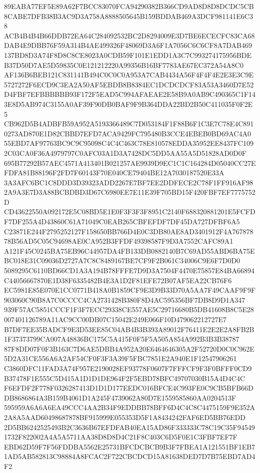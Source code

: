 \documentclass[UTF8,fontset=fandol,zihao=-4,a4paper]{ctexart}
\begin{document}
{{89EABA77EF5E89A62F7BCC83070FCA94290382B366CD9AD8D8D8DCDC5CB8CABE7DFB38B3AC9D3A758A8888505645B159BDDAB469A3DCF981141E6C38
ACB4B4B4B66DDB72EA64C284092532BC2D8294009E3D7BE6ECECFC83CA68DAB4E9DBB76F59A314B4AE499326F48069D3A6F1A7056C6C6CF8A7DAB469
137BD8D3A74F8D8C8CE8023A0CDB59F101E1EDD1A3C7C993274175956BDEB37D50D7AE5D59835C0E121212220A99356B16BF7783AE67EC372A54A8C0
AF136B6BEB121C831141B494C0C0C0A953A7CAB4434A56F4F4F4E2E3E3C9E5727272F6ECD9C3EA2A50AF5EBDB8B8384EC1DCDCDCF83A53A3460D7E52
D4FBF7EFBBBBBB93F172F5EAD5C994AFAEAE2E58B9A0AB9C490365C1F143E8D5AB974C3155A0AF39F90DB0BAF9F9B364DDA22BD2B50C411035F0F2E5
CB962D5B4ADBFB59A952A5193366489C7D053184F1F88B6F1C3E7C78E4C8910273AD870E1D82CBBD7EFD7ACA9429FC795480B3CCE4EBEB0BD69AC4A0
55EBD7AF97763BC9C9C95098C4C4C463C78E810578EDDA35952EE8437FC1092C03CA0F36A4979797C0AFC03A1D3A7428DC5DD5AA55A5D51828AD0D0F
695B77292B57AEC4571A413401B021257AE9939D9EC1C1C164284D05040CC27EFDFA81B88196F2FD7F60143F70E040CE79404BE12A7030187520E33A
3A3AFC6BC1C8DDD3D39323ADD2267E7BF7EE2DDFECE2C78F1FF916AF982A9A3E7D3A88BCBDBD3D67C6980EE7E11E39F705BD15F420FBF7EF7775752D
CD43622550A092172E5C08BD5E1E0F3F3F3F8951C2140F688320881201E5FCFDF7DF255A4D43860C61A71049C0EAB265CBFEFDF7DF45DA727DFBF6A5
C23871E244F2795252127F158650BB766D4E0C3DB80AE8AD3401912F4A76787878B56AD5C05C94698AE0CA952B3FFDF49398587F9D3A7552CAFC89A1
A121F45C0245BA75EB96C44957DA4FB133DB0882140B7C69AD55ABD6BA75EBC018E31C09036D2727A7C8C8489167BE7CF9F2B061C34006C9E6F7D0D0
5089295C6110BD66CD1A3A194B78FFFE7D9D3A7504F4470E75857E84BA66894C44056667870E1D38F6335482B4E3A1D2F81EFE72B07AF5EA22CB76F6
EC5981E85E070E1CC0771B418A0B1859CF9E3D9B33D70A5AA7F49CAAF9F9F903060C90B8A7C0CCCC4CA2731428B380F8D4AC595356BF7DB8D9D1A347
939F57AC5851CCCF1F3F7ECC29338CE557AE5C29716680B5DB41608B8C5E28007401126789A11AC9CC00DB07C15042E249E066F10D479062212727E7
B7DF7EE35BADCF9E3D53EE85C04AB4B3B393A89012F76411E2E2E2A8FB2B1F37373799CA007A48836BC175C5A415F0F5F5A505A854A992B3B3B38787
87F8DD07F0F3B163C7D6AE5DBB4A952A20E6464646305A2F52720D0C0C962E5D2A31CE556A6A2AF54CF0F3F3A39F5FBC7851E2A940E1F12547906261
C3860DFC11FAD3A74F957E2190028EF93778F0607F7FFFCF9F3F0BFFF0CD9B37478F1E555C5D415A1D1D1DE964F2F5EBD78BFC49707030B15A4D4C4C
F6EFDF2F778F0326287413D1D1D177EEDC016BFCE4C993FE0C9CB5BFB66DDB8686864A3B159B4061D1A245F4739062A80D7E1559585860AA0204513F
595959A6A6A6EA49CCC4AA2B34F9EDDBB78BFF6D4C4C8C4475159F9E352A2A8A5AAD60498687878BF915999E055353D5F1A8434242FAF6ED5BB76EDD
2D5BB6242525493B2C3636B67EFDFAB40EA15AD86F333333C78C19C35F945491732F822002A4A5A5711AA38D8D8D4C21F8C403C6D5F0E1C3FBF7EF7F
EBD62D59F7F56FDDBA5562E25731BFCDCBCB9B3F7FBEA1A121551BF1EB71AD5AB582813C98884A8FCAC2F722CBCDCD15A81638DED7D7B75EBD7AD4F2
}}
\end{document}
